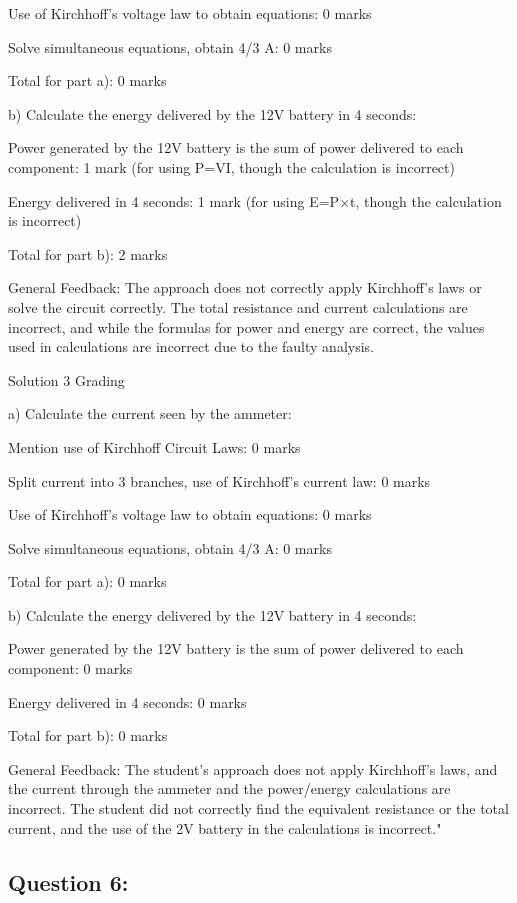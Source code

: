 \documentclass[a4paper,11pt]{article}
\begin{document}
Use of Kirchhoff’s voltage law to obtain equations: 0 marks

Solve simultaneous equations, obtain 4/3 A: 0 marks

Total for part a): 0 marks

b) Calculate the energy delivered by the 12V battery in 4 seconds:

Power generated by the 12V battery is the sum of power delivered to each component: 1 mark (for using P=VI, though the calculation is incorrect)

Energy delivered in 4 seconds: 1 mark (for using E=P×t, though the calculation is incorrect)

Total for part b): 2 marks

General Feedback:
The approach does not correctly apply Kirchhoff's laws or solve the circuit correctly. The total resistance and current calculations are incorrect, and while the formulas for power and energy are correct, the values used in calculations are incorrect due to the faulty analysis.

Solution 3 Grading

a) Calculate the current seen by the ammeter:

Mention use of Kirchhoff Circuit Laws: 0 marks

Split current into 3 branches, use of Kirchhoff’s current law: 0 marks

Use of Kirchhoff’s voltage law to obtain equations: 0 marks

Solve simultaneous equations, obtain 4/3 A: 0 marks

Total for part a): 0 marks

b) Calculate the energy delivered by the 12V battery in 4 seconds:

Power generated by the 12V battery is the sum of power delivered to each component: 0 marks

Energy delivered in 4 seconds: 0 marks

Total for part b): 0 marks

General Feedback:
The student's approach does not apply Kirchhoff's laws, and the current through the ammeter and the power/energy calculations are incorrect. The student did not correctly find the equivalent resistance or the total current, and the use of the 2V battery in the calculations is incorrect."

\subsection*{Question 6:}
\end{document}
